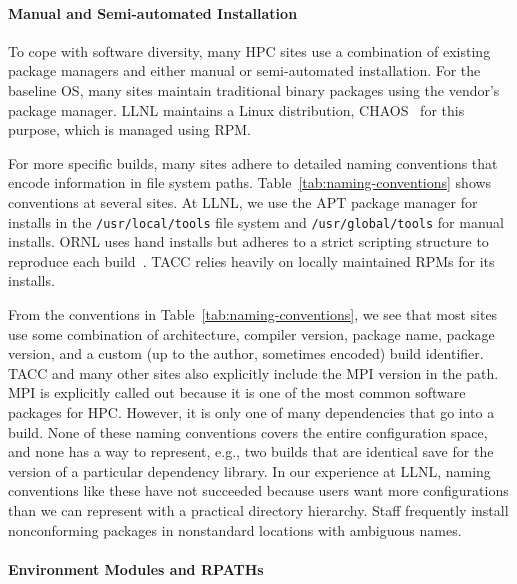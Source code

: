 \paragraph{Manual and Semi-automated Installation}

To cope with software diversity, many HPC sites use a combination of existing
package managers and either manual or semi-automated installation.
For the baseline OS, many sites maintain traditional binary
packages using the vendor's package manager. LLNL maintains a Linux
distribution, CHAOS~\cite{chaos} for this purpose, which is managed using RPM.

For more specific builds, many sites adhere to detailed naming conventions
that encode information in file system paths.
Table~\ref{tab:naming-conventions} shows conventions
at several sites. At LLNL, we use the APT package manager for installs
in the {\tt /usr/local/tools} file system and {\tt /usr/global/tools}
for manual installs.
ORNL uses hand installs but adheres to a strict scripting structure
to reproduce each build~\cite{jones+:cug08}.
TACC relies heavily on locally maintained RPMs for its installs.

From the conventions in Table~\ref{tab:naming-conventions},
we see that most sites use some combination of architecture, compiler version,
package name, package version, and a custom (up to the author, sometimes
encoded) build identifier.  TACC and many other sites also explicitly
include the MPI version in the path. MPI is explicitly called out
because it is one of the most common software packages for HPC.
However, it is only one of many dependencies that go into a build.
None of these naming conventions covers the entire configuration
space, and none has a way to represent, e.g., two builds that are identical
save for the version of a particular dependency library.  In our experience
at LLNL, naming conventions like these have not succeeded because
users want more configurations than we can represent with a practical
directory hierarchy. Staff frequently install nonconforming packages
in nonstandard locations with ambiguous names.

\paragraph{Environment Modules and RPATHs}\label{sec:env-rpath}

